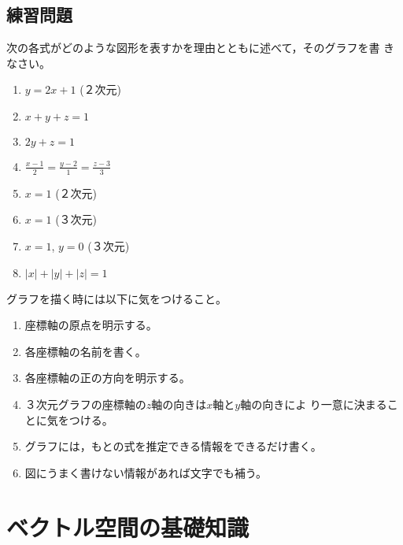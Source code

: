 \documentclass[twocolumn,11pt]{jarticle}
\begin{document}
\subsection{練習問題}

次の各式がどのような図形を表すかを理由とともに述べて，そのグラフを書
きなさい。
\begin{enumerate}
\item $y=2x+1$ (２次元)
\item $\displaystyle x+y+z=1$
\item $\displaystyle 2y+z=1$
\item $\displaystyle \frac{x-1}{2}=\frac{y-2}{1}=\frac{z-3}{3}$
\item $x=1$ (２次元)
\item $x=1$ (３次元)
\item $x=1$, $y=0$ (３次元)
\item $|x|+|y|+|z|=1$
\end{enumerate}
\comment
グラフを描く時には以下に気をつけること。
\begin{enumerate}
\item 座標軸の原点を明示する。
\item 各座標軸の名前を書く。
\item 各座標軸の正の方向を明示する。
\item ３次元グラフの座標軸の$z$軸の向きは$x$軸と$y$軸の向きによ
  り一意に決まることに気をつける。
\item グラフには，もとの式を推定できる情報をできるだけ書く。
\item 図にうまく書けない情報があれば文字でも補う。
\end{enumerate}


\section{ベクトル空間の基礎知識}
\end{document}

